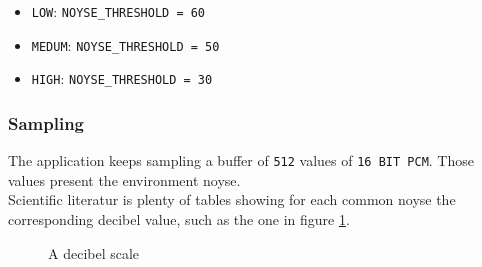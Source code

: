 \documentclass[conference]{IEEEtran}
\begin{document}
\begin{itemize}
	\item \texttt{LOW}: \texttt{NOYSE\_THRESHOLD = 60}
	\item \texttt{MEDUM}:  \texttt{NOYSE\_THRESHOLD = 50}
	\item \texttt{HIGH}:  \texttt{NOYSE\_THRESHOLD = 30}
\end{itemize}

\subsubsection{\textbf{Sampling}}
The application keeps sampling a buffer of \texttt{512} values of \texttt{16 BIT PCM}. Those values present the environment noyse.\\ Scientific literatur is plenty of tables showing for each common noyse the corresponding decibel value, such as the one in figure \ref{img:decibels}. 

\begin{figure}[!ht]
\begin{center}
\caption{A decibel scale}
\label{img:decibels}
\end{center}
\end{figure}
\end{document}
